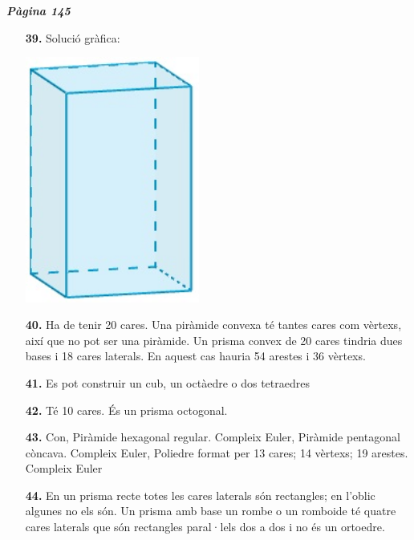 \documentclass[a4paper, pdf, twoside]{book}
\begin{document}
\begin{multicols}{2}
{\textbf{\em Pàgina 145}} \hrulefill
\begin{enumerate}
\vspace{0.25cm}
\item[\fontfamily{phv}\selectfont\color{blue}\textbf{39. }] 
Solució gràfica: \par \includegraphics [width=0.45\textwidth ]{img-sol/prisma-cuadrangular}
 \end{enumerate}
\begin{enumerate}
\vspace{0.25cm}
\item[\fontfamily{phv}\selectfont\color{blue}\textbf{40. }] 
Ha de tenir 20 cares. Una piràmide convexa té tantes cares com vèrtexs, així que no pot ser una piràmide. Un prisma convex de 20 cares tindria dues bases i 18 cares laterals. En aquest cas hauria 54 arestes i 36 vèrtexs.
\vspace{0.25cm}
\item[\fontfamily{phv}\selectfont\color{blue}\textbf{41. }] 
Es pot construir un cub, un octàedre o dos tetraedres
\vspace{0.25cm}
\item[\fontfamily{phv}\selectfont\color{blue}\textbf{42. }] 
Té 10 cares. És un prisma octogonal.
\vspace{0.25cm}
\item[\fontfamily{phv}\selectfont\color{blue}\textbf{43. }] 
Con, Piràmide hexagonal regular. Compleix Euler, Piràmide pentagonal còncava. Compleix Euler, Poliedre format per 13 cares; 14 vèrtexs; 19 arestes. Compleix Euler
\vspace{0.25cm}
\item[\fontfamily{phv}\selectfont\color{blue}\textbf{44. }] 
En un prisma recte totes les cares laterals són rectangles; en l'oblic algunes no els són. Un prisma amb base un rombe o un romboide té quatre cares laterals que són rectangles paral·lels dos a dos i no és un ortoedre.

\end{enumerate}
\end{multicols}
\end{document}
